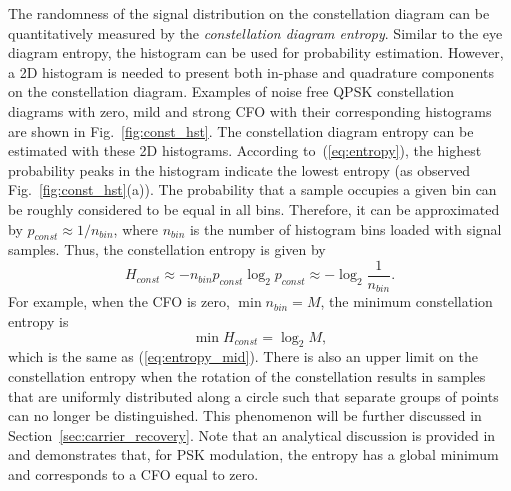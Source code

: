 \documentclass[12pt, draftclsnofoot, onecolumn]{IEEEtran}
\begin{document}
The randomness of the signal distribution on the constellation diagram can be quantitatively measured by the \textit{constellation diagram entropy}.
Similar to the eye diagram entropy, the histogram can be used for probability estimation.
However, a 2D histogram is needed to present both in-phase and quadrature components on the constellation diagram.
Examples of noise free QPSK constellation diagrams with zero, mild and strong CFO with their corresponding histograms are shown in Fig.~\ref{fig:const_hst}.
The constellation diagram entropy can be estimated with these 2D histograms.
According to~(\ref{eq:entropy}), the highest probability peaks in the histogram indicate the lowest entropy (as observed Fig.~\ref{fig:const_hst}(a)).
The probability that a sample occupies a given bin can be roughly considered to be equal in all bins. 
Therefore, it can be approximated by \(p_{const} \approx {1}/{n_{bin}}\), where \(n_{bin}\) is the number of histogram bins loaded with signal samples.
Thus, the constellation entropy is given by
\begin{equation}
H_{const} \approx - n_{bin} p_{const} \log_2 {p_{const}} \approx -\log_2 {\frac{1}{n_{bin}}}.
\label{eq:const_ent}
\end{equation}
For example, when the CFO is zero, \(\min{n_{bin}}=M\),  the minimum constellation entropy is
\begin{equation}
\min{H_{const}=\log_2 {M}},
\end{equation}
which is the same as (\ref{eq:entropy_mid}).
There is also an upper limit on the constellation entropy 
when the rotation of the constellation results in samples that are uniformly distributed along a circle such that separate groups of points can no longer be distinguished.  
% 
% 
This phenomenon will be further discussed in Section~\ref{sec:carrier_recovery}.
Note that an analytical discussion is provided in \cite{Pedzisz2006} and demonstrates that, for PSK modulation,
the entropy has a global minimum and corresponds to a CFO equal to zero.
\end{document}

